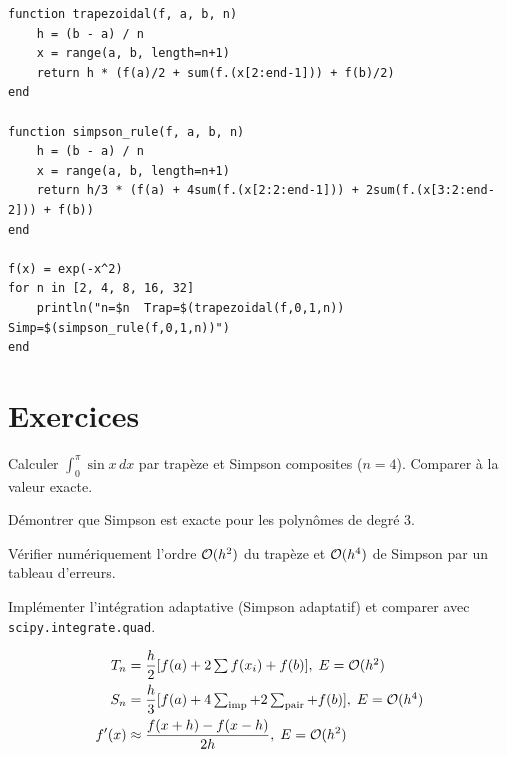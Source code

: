 \begin{codeblock}[title=\textbf{Julia}]
\begin{verbatim}
function trapezoidal(f, a, b, n)
    h = (b - a) / n
    x = range(a, b, length=n+1)
    return h * (f(a)/2 + sum(f.(x[2:end-1])) + f(b)/2)
end

function simpson_rule(f, a, b, n)
    h = (b - a) / n
    x = range(a, b, length=n+1)
    return h/3 * (f(a) + 4sum(f.(x[2:2:end-1])) + 2sum(f.(x[3:2:end-2])) + f(b))
end

f(x) = exp(-x^2)
for n in [2, 4, 8, 16, 32]
    println("n=$n  Trap=$(trapezoidal(f,0,1,n))  Simp=$(simpson_rule(f,0,1,n))")
end
\end{verbatim}
\end{codeblock}

\section{Exercices}

\begin{exercice}[$\star$]
Calculer $\int_0^\pi\sin x\,dx$ par trap\`eze et Simpson composites ($n=4$). Comparer \`a la valeur exacte.
\end{exercice}

\begin{exercice}[$\star\star$]
D\'emontrer que Simpson est exacte pour les polyn\^omes de degr\'e 3.
\end{exercice}

\begin{exercice}[$\star\star$]
V\'erifier num\'eriquement l'ordre $\mathcal{O}(h^2)$ du trap\`eze et $\mathcal{O}(h^4)$ de Simpson par un tableau d'erreurs.
\end{exercice}

\begin{exercice}
Impl\'ementer l'int\'egration adaptative (Simpson adaptatif) et comparer avec \texttt{scipy.integrate.quad}.
\end{exercice}

\begin{formules}
\begin{align*}
T_n &= \frac{h}{2}[f(a)+2\textstyle\sum f(x_i)+f(b)], \; E=\mathcal{O}(h^2) \\
S_n &= \frac{h}{3}[f(a)+4\textstyle\sum_{\text{imp}}+2\textstyle\sum_{\text{pair}}+f(b)], \; E=\mathcal{O}(h^4) \\
f'(x) &\approx \frac{f(x+h)-f(x-h)}{2h}, \; E=\mathcal{O}(h^2)
\end{align*}
\end{formules}
